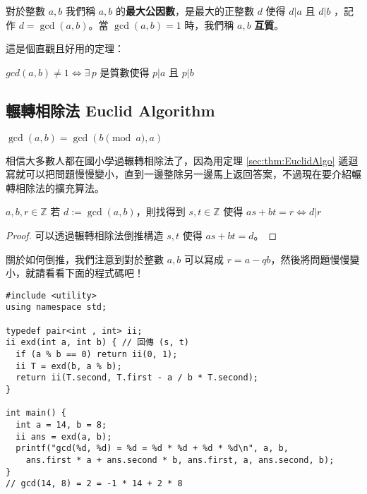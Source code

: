 \begin{definition}
對於整數 $a,b$ 我們稱 $a,b$ 的\textbf{最大公因數}，是最大的正整數 $d$ 使得 $d|a$ 且 $d|b$ ，記作 $d=\gcd(a,b)$。當 $\gcd(a,b)=1$ 時，我們稱 $a,b$ \textbf{互質}。
\end{definition}

這是個直觀且好用的定理：

\begin{theorem}
$gcd(a,b)\neq 1\Leftrightarrow\exists\,p$ 是質數使得 $p|a$ 且 $p|b$
\end{theorem}



\subsection{輾轉相除法 Euclid Algorithm}
\label{sec:div:eu}

\begin{theorem}
\label{sec:thm:EuclidAlgo}
$\gcd(a,b)=\gcd(b\pmod a,a)$
\end{theorem}

相信大多數人都在國小學過輾轉相除法了，因為用定理 \ref{sec:thm:EuclidAlgo} 遞迴寫就可以把問題慢慢變小，直到一邊整除另一邊馬上返回答案，不過現在要介紹輾轉相除法的擴充算法。

\begin{theorem}
$a,b,r\in\mathbb{Z}$ 若 $d:=\gcd(a,b)$，則找得到 $s,t\in\mathbb{Z}$ 使得 $as+bt=r \Leftrightarrow d|r$
\end{theorem}
\begin{proof}
可以透過輾轉相除法倒推構造 $s,t$ 使得 $as+bt=d$。
\end{proof}

關於如何倒推，我們注意到對於整數 $a,b$ 可以寫成 $r=a-qb$，然後將問題慢慢變小，就請看看下面的程式碼吧！
\begin{lstlisting}[caption=遞迴的擴充輾轉相除法]
#include <utility>
using namespace std;

typedef pair<int , int> ii;
ii exd(int a, int b) { // 回傳 (s, t)
  if (a % b == 0) return ii(0, 1);
  ii T = exd(b, a % b);
  return ii(T.second, T.first - a / b * T.second);
}

int main() {
  int a = 14, b = 8;
  ii ans = exd(a, b);
  printf("gcd(%d, %d) = %d = %d * %d + %d * %d\n", a, b,
    ans.first * a + ans.second * b, ans.first, a, ans.second, b);
}
// gcd(14, 8) = 2 = -1 * 14 + 2 * 8
\end{lstlisting}

